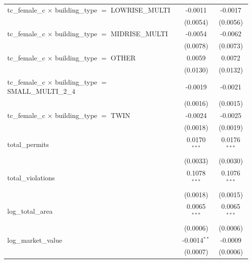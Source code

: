 \begin{tabular}{lcc}
   tc\_female\_c $\times$ building\_type $=$ LOWRISE\_MULTI            & -0.0011                & -0.0017\\   
                                                                       & (0.0054)               & (0.0056)\\   
   tc\_female\_c $\times$ building\_type $=$ MIDRISE\_MULTI            & -0.0054                & -0.0062\\   
                                                                       & (0.0078)               & (0.0073)\\   
   tc\_female\_c $\times$ building\_type $=$ OTHER                     & 0.0059                 & 0.0072\\   
                                                                       & (0.0130)               & (0.0132)\\   
   tc\_female\_c $\times$ building\_type $=$ SMALL\_MULTI\_2\_4        & -0.0019                & -0.0021\\   
                                                                       & (0.0016)               & (0.0015)\\   
   tc\_female\_c $\times$ building\_type $=$ TWIN                      & -0.0024                & -0.0025\\   
                                                                       & (0.0018)               & (0.0019)\\   
   total\_permits                                                      & 0.0170$^{***}$         & 0.0176$^{***}$\\   
                                                                       & (0.0033)               & (0.0030)\\   
   total\_violations                                                   & 0.1078$^{***}$         & 0.1076$^{***}$\\   
                                                                       & (0.0018)               & (0.0015)\\   
   log\_total\_area                                                    & 0.0065$^{***}$         & 0.0065$^{***}$\\   
                                                                       & (0.0006)               & (0.0006)\\   
   log\_market\_value                                                  & -0.0014$^{**}$         & -0.0009\\   
                                                                       & (0.0007)               & (0.0006)\\   

\end{tabular}
